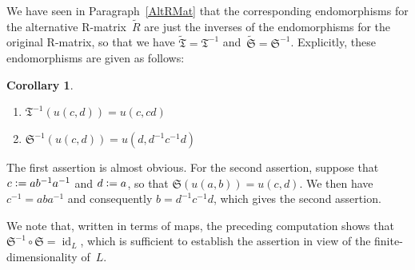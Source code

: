 \documentclass[12pt]{article}
\makeatletter
\newcounter{num}
\theoremstyle{definition}
\newtheorem{Cor}[Satz]{Corollary}
\theoremstyle{break}
\renewenvironment{proof}[1][\proofname]{\par
\vspace{-5pt}%
\pushQED{\qed}%
\normalfont
\topsep0pt \partopsep0pt %
\trivlist
\item[\hskip\labelsep
\bfseries
#1\@addpunct{.}]\ignorespaces
}{%
\popQED\endtrivlist\@endpefalse
\addvspace{6pt plus 6pt} %
}
\DeclareMathOperator\id{id}
\newcommand{\fS}{\mathfrak{S}}
\newcommand{\fT}{\mathfrak{T}}
\renewcommand{\1}{\mathbbm{1}}
\newcommand{\uu}{u}
\newcommand{\deq}{\vcentcolon =}
\makeatother
\begin{document}
We have seen in Paragraph~\ref{AltRMat} that the corresponding endomorphisms for the alternative R-matrix~$\tilde{R}$ are just the inverses of the endomorphisms for the original R-matrix, so that we have $\tilde{\fT} = \fT^{-1}$ and~$\tilde{\fS} = \fS^{-1}$. Explicitly, these endomorphisms are given as follows:
\begin{Cor} \label{InvST}
\begin{enumerate}
\item
$\fT^{-1}(\uu(c, d)) = \uu(c, cd)$

\item
$\fS^{-1}(\uu(c, d)) = \uu(d, d^{-1} c^{-1} d)$
\end{enumerate}
\end{Cor}
\begin{proof}
The first assertion is almost obvious. For the second assertion, suppose that
$c \deq a b^{-1} a^{-1}$ and $d \deq a$, so that
$\fS(\uu(a,b)) = \uu(c, d)$. We then have $c^{-1} = a b a^{-1}$ and consequently $b = d^{-1} c^{-1} d$, which gives the second assertion.
\end{proof}

We note that, written in terms of maps, the preceding computation shows that $\fS^{-1} \circ \fS = \id_L$, which is sufficient to establish the assertion in view of the finite-dimensionality of~$L$.
\end{document}
